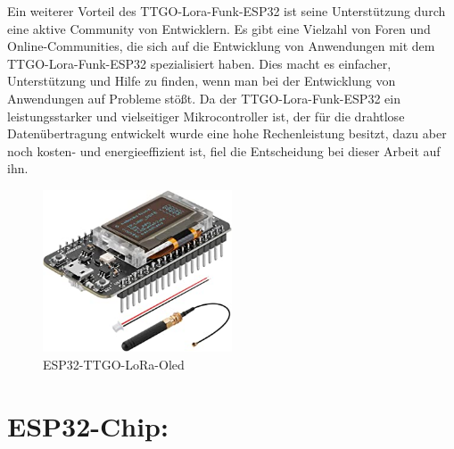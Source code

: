 Ein weiterer Vorteil des TTGO-Lora-Funk-ESP32 ist seine Unterstützung durch eine aktive Community von Entwicklern. Es gibt eine Vielzahl von Foren und Online-Communities, die sich auf die Entwicklung von Anwendungen mit dem TTGO-Lora-Funk-ESP32 spezialisiert haben. Dies macht es einfacher, Unterstützung und Hilfe zu finden, wenn man bei der Entwicklung von Anwendungen auf Probleme stößt.
Da der TTGO-Lora-Funk-ESP32 ein leistungsstarker und vielseitiger Mikrocontroller ist, der für die drahtlose Datenübertragung entwickelt wurde eine hohe Rechenleistung besitzt, dazu aber noch kosten- und energieeffizient ist, fiel die Entscheidung bei dieser Arbeit auf ihn.
\cite{esp32}
\begin{figure}[b]
    \centering
    \includegraphics[width=0.5\textwidth]{./pics/ttgoLoraOled.jpg}
    \caption{ESP32-TTGO-LoRa-Oled}
    \label{fig:TTGO-ESP32}
  \end{figure}

\newpage
\section{ESP32-Chip:}


